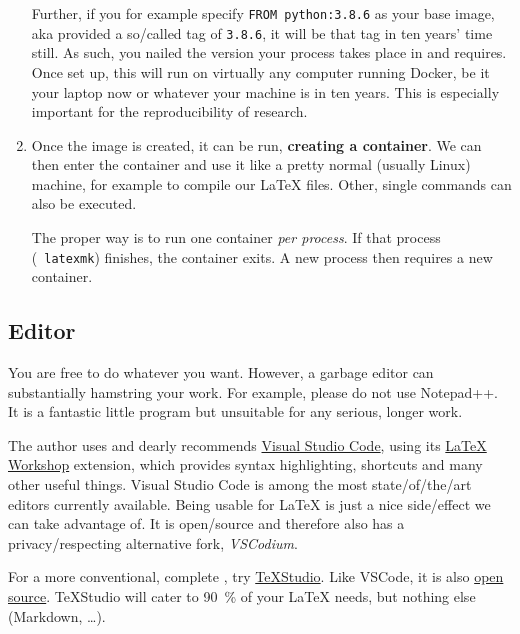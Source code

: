 \begin{enumerate}
        Further, if you for example specify \texttt{FROM python:3.8.6}
        as your base image, aka provided a so\-/called tag of \texttt{3.8.6}, it will be that tag in ten years' time still.
        As such, you nailed the version your process takes place in and requires.
        Once set up, this will run on virtually any computer running Docker, be it your
        laptop now or whatever your machine is in ten years.
        This is especially important for the reproducibility of research.
    \item Once the image is created, it can be run, \textbf{creating a container}.
        We can then enter the container and use it like a pretty normal (usually Linux)
        machine, for example to compile our \LaTeX{} files.
        Other, single commands can also be executed.

        The proper way is to run one container \emph{per process}.
        If that process (\ \texttt{latexmk}) finishes, the container exits.
        A new process then requires a new container.
\end{enumerate}

\subsection{Editor}
\label{ch:editor}

You are free to do whatever you want.
However, a garbage editor can substantially hamstring your work.
For example, please do not use Notepad++.
It is a fantastic little program but unsuitable for any serious, longer work.

The author uses and dearly recommends \href{https://code.visualstudio.com/}{Visual Studio Code},
using its
\href{https://marketplace.visualstudio.com/items?itemName=James-Yu.latex-workshop}{\LaTeX{} Workshop} extension, which provides syntax highlighting, shortcuts and many other useful things.
Visual Studio Code is among the most state\-/of\-/the\-/art editors currently available.
Being usable for \LaTeX{} is just a nice side\-/effect we can take advantage of.
It is open\-/source and therefore also has a privacy\-/respecting alternative fork, \emph{VSCodium}.

For a more conventional, complete ,
try \href{https://www.texstudio.org/}{TeXStudio}.
Like VSCode, it is also
\href{https://github.com/texstudio-org/texstudio}{open source}.
TeXStudio will cater to \SI{90}{\percent} of your \LaTeX{} needs, but nothing else (Markdown, \dots{}).

